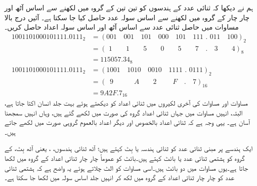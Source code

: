 ہم نے دیکھا کہ ثنائی عدد کے ہندسوں  کو تین تین کے گروہ میں لکھنے سے اساس آٹھ اور چار چار کے گروہ میں لکھنے سے اساس سولہ  عدد حاصل کیا جا سکتا ہے۔ آئیں   درج بالا مساوات میں حاصل ثنائی عدد سے اساس آٹھ اور اساس سولہ  اعداد حاصل کریں۔
 \begin{align*}
 1001101000101111.0111_2&=(001\quad 001\quad 101\quad 000\quad 101\quad 111\,\, . \,\,011\quad 100)_2\\
 &=(\,\,1\quad \quad 1\quad \quad 5\quad \quad 0 \quad \quad 5\quad \quad 7\quad .\quad  3\quad \quad 4)_8\\
 &=115057.34_8\\
  1001101000101111.0111_2&=(1001\quad 1010\quad 0010\quad 1111\,\, . \,\,0111)_2\\
 &=(\,\,\,9\quad \quad \quad A\quad \quad 2\quad \quad \,\,F \quad  . \quad  7)_{16}\\
 &=9A2F.7_{16}
 \end{align*}
	مساوات    اور  مساوات   کی آخری لکیروں میں ثنائی اعداد کو دیکھتے ہوئے بہت جلد انسان اکتا جاتا ہے،  البتہ،  انہیں مساوات میں جہاں ثنائی اعداد  گروہ کی صورت  میں لکھے  گئے ہیں،  وہاں انہیں سمجھنا  آسان  ہے۔ یہی وجہ ہے کہ ثنائی اعداد   بالخصوص اور دیگر اعداد   بالعموم گروہی  صورت   میں لکھے جاتے ہیں۔
	
ایک ہندسے پر مبنی ثنائی عدد کو ثنائی ہندسہ یا بِٹ  کہتے ہیں؛    آٹھ ثنائی ہندسوں، ، یعنی آٹھ بِٹ،  کے گروہ  کو   ہشتمی ثنائی عدد یا  بائٹ کہتے ہیں۔بائٹ کو  عموماً  چار چار  ثنائی اعداد کے گروہ میں لکھا جاتا ہے۔یوں مساوات    میں دو بائٹ ہیں۔اسی مساوات کو الٹ چلاتے ہوئے یہ واضح ہے کہ ہشتمی ثنائی عدد کو چار چار ثنائی اعداد کے  گروہ میں لکھ کر انہیں جلد اساس سولہ میں لکھا جا سکتا ہے۔
